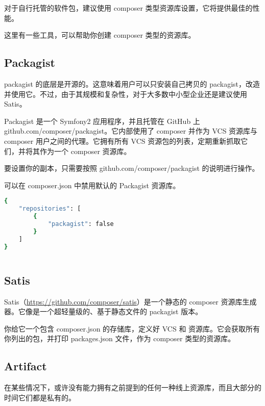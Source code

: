 对于自行托管的软件包，建议使用 composer 类型资源库设置，它将提供最佳的性能。

这里有一些工具，可以帮助你创建 composer 类型的资源库。

\subsection{Packagist}

packagist 的底层是开源的。这意味着用户可以只安装自己拷贝的 packagist，改造并使用它。不过，由于其规模和复杂性，对于大多数中小型企业还是建议使用 Satis。

Packagist 是一个 Symfony2 应用程序，并且托管在 GitHub 上 github.com/composer/packagist。它内部使用了 composer 并作为 VCS 资源库与 composer 用户之间的代理。它拥有所有 VCS 资源包的列表，定期重新抓取它们，并将其作为一个 composer 资源库。

要设置你的副本，只需要按照 github.com/composer/packagist 的说明进行操作。

可以在 composer.json 中禁用默认的 Packagist 资源库。

\begin{lstlisting}[language=bash]
{
    "repositories": [
        {
            "packagist": false
        }
    ]
}
\end{lstlisting}






\begin{lstlisting}[language=bash]

\end{lstlisting}

\subsection{Satis}

Satis（\url{https://github.com/composer/satis}）是一个静态的 composer 资源库生成器。它像是一个超轻量级的、基于静态文件的 packagist 版本。

你给它一个包含 composer.json 的存储库，定义好 VCS 和 资源库。它会获取所有你列出的包，并打印 packages.json 文件，作为 composer 类型的资源库。



\subsection{Artifact}

在某些情况下，或许没有能力拥有之前提到的任何一种线上资源库，而且大部分的时间它们都是私有的。

